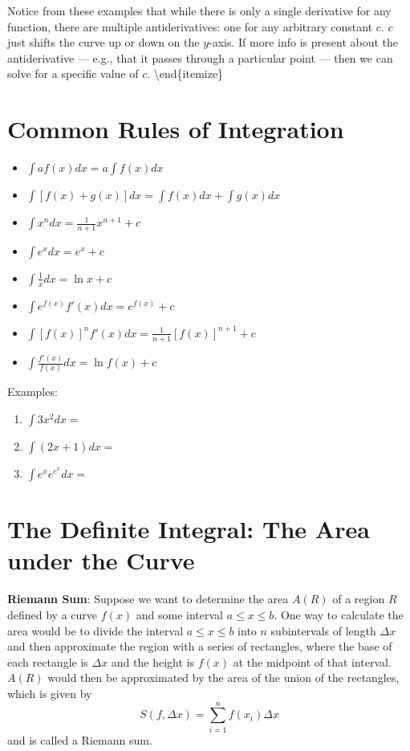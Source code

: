 \documentclass[]{book}
\theoremstyle{definition}
\theoremstyle{definition}
\theoremstyle{definition}
\theoremstyle{remark}
\begin{document}
Notice from these examples that while there is only a single derivative
for any function, there are multiple antiderivatives: one for any
arbitrary constant \(c\). \(c\) just shifts the curve up or down on the
\(y\)-axis. If more info is present about the antiderivative --- e.g.,
that it passes through a particular point --- then we can solve for a
specific value of \(c\). \textbackslash{}end\{itemize\}

\section{Common Rules of Integration}\label{common-rules-of-integration}

\begin{itemize}
\item $\int a f(x)dx = a\int f(x)dx$
\item $\int [f(x)+g(x)]dx=\int f(x)dx + \int g(x)dx$
\item $\int x^n dx = \frac{1}{n+1} x^{n+1} + c $
\item $\int e^x dx = e^x +c$
\item $\int \frac{1}{x} dx = \ln x + c$
\item $\int e^{f(x)}f'(x)dx = e^{f(x)}+c$
\item $\int [f(x)]^n f'(x)dx = \frac{1}{n+1}[f(x)]^{n+1}+c$
\item $\int \frac{f'(x)}{f(x)}dx=\ln f(x) + c$
\end{itemize}

\begin{framed}
Examples:
\begin{enumerate}
    \item $\int 3x^2 dx= $
    \item $\int (2x+1)dx=$
    \item $\int e^x e^{e^x} dx = $
\end{enumerate}
\end{framed}

\section{The Definite Integral: The Area under the
Curve}\label{the-definite-integral-the-area-under-the-curve}

\textbf{Riemann Sum}: Suppose we want to determine the area \(A(R)\) of
a region \(R\) defined by a curve \(f(x)\) and some interval
\(a\le x \le b\). One way to calculate the area would be to divide the
interval \(a\le x\le b\) into \(n\) subintervals of length \(\Delta x\)
and then approximate the region with a series of rectangles, where the
base of each rectangle is \(\Delta x\) and the height is \(f(x)\) at the
midpoint of that interval. \(A(R)\) would then be approximated by the
area of the union of the rectangles, which is given by
\[S(f,\Delta x)=\sum\limits_{i=1}^n f(x_i)\Delta x\] and is called a
Riemann sum.
\end{document}
